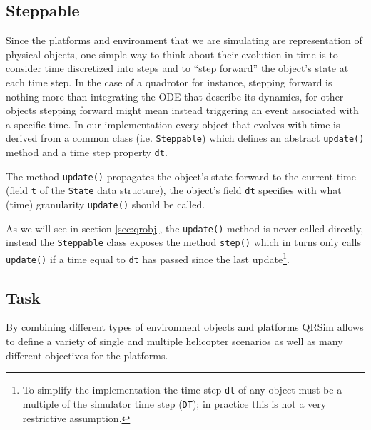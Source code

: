 \documentclass[a4paper,11pt]{report}
\newcommand{\sname}{QRSim\xspace}
\begin{document}
\subsection{Steppable}

Since the platforms and environment that we are simulating are representation of physical objects, one simple way to think about their evolution in time is to consider time discretized into steps and to ``step forward'' the object's state at each time step. In the case of a quadrotor for instance, stepping forward is nothing more than integrating the ODE that describe its dynamics, for other objects stepping forward might mean instead triggering an event associated with a specific time.
In our implementation every object that evolves with time is derived from a common class (i.e. \texttt{Steppable}) which defines an abstract \texttt{update()} method and a time step property \texttt{dt}.

The method \texttt{update()} propagates the object's state forward to the current time (field \texttt{t} of the \texttt{State} data structure), the object's field \texttt{dt} specifies with what (time) granularity \texttt{update()} should be called. 

As we will see in section \ref{sec:qrobj}, the \texttt{update()} method is never called directly, instead the  \texttt{Steppable} class exposes the method \texttt{step()} which in turns only calls \texttt{update()} if a time equal to \texttt{dt} has passed since the last update\footnote{To simplify the implementation the time step \texttt{dt} of any object must be a multiple of the simulator time step (\texttt{DT}); in practice this is not a very restrictive assumption.}.

\subsection{Task}

By combining different types of environment objects and platforms \sname allows to define a variety of single and multiple helicopter scenarios as well as many different objectives for the platforms.
\end{document}
